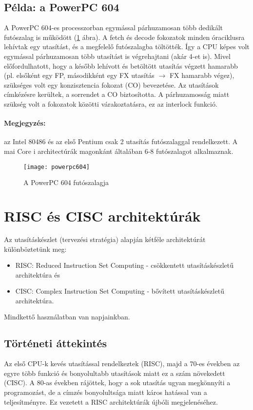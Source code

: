 \subsection{Példa: a PowerPC 604}
A PowerPC 604-es processzorban egymással párhuzamosan több dedikált futószalag is működött (\ref{fig:powerpc604} ábra).
A fetch és decode fokozatok minden óraciklusra lehívtak egy utasítást, és a megfelelő futószalagba töltötték.
Így a CPU képes volt egymással párhuzamosan több utasítást is végrehajtani (akár 4-et is).
Mivel előfordulhatott, hogy a később lehívott és betöltött utasítás végzett hamarabb (pl. elsőként egy FP, másodikként egy FX utasítás $\rightarrow$ FX hamarabb végez), szükséges volt egy konzisztencia fokozat (CO) bevezetése.
Az utasítások címkézésre kerültek, a sorrendet a CO biztosította.
A párhuzamosság miatt szükség volt a fokozatok közötti várakoztatásra, ez az interlock funkció.
\paragraph{Megjegyzés:} az Intel 80486 és az első Pentium csak 2 utasítás futószalaggal rendelkezett. A mai Core i architectúrák magonkánt általában 6-8 futószalagot alkalmaznak.
\label{powerpc604}
\begin{figure}[H]
    \texttt{[image: powerpc604]}
    \centering
    \caption{A PowerPC 604 futószalagja}
    \label{fig:powerpc604}
\end{figure}

\section{RISC és CISC architektúrák}
Az utasításkészlet (tervezési stratégia) alapján kétféle architektúrát különböztetünk meg:
\begin{itemize}
    \item RISC: Reduced Instruction Set Computing - csökkentett utasításkészletű architektúra és
    \item CISC: Complex Instruction Set Computing - bővített utasításkészletű architektúra.
\end{itemize}
Mindkettő használatban van napjainkban.
\subsection{Történeti áttekintés}
Az első CPU-k kevés utasítással rendelkeztek (RISC), majd a 70-es években az egyre több funkció és bonyolultabb utasítások miatt ez a szám növekedett (CISC).
A 80-as években rájöttek, hogy a sok utasítás ugyan megkönnyíti a programozást, de a címzés bonyolultsága miatt káros hatással van a teljesítményre.
Ez vezetett a RISC architektúrák újbóli megjelenéséhez.

